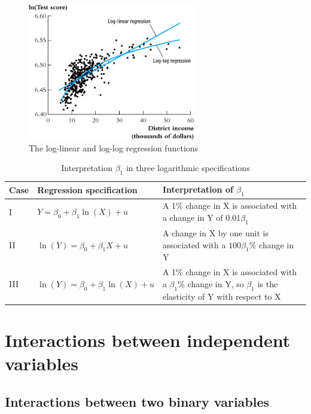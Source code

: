\documentclass[a4paper,11pt]{article}
\begin{document}
\begin{itemize}
\begin{figure}[htbp]
\centering
\includegraphics[width=0.65\textwidth]{img/fig-8-6.png}
\caption{\label{fig:org04cb59a}
The log-linear and log-log regression functions}
\end{figure}

\begin{table}[htbp]
\caption{Interpretation \(\beta_1\) in three logarithmic specifications}
\centering
\begin{tabular}{lp{4.5cm}p{8.5cm}}
Case & Regression specification & Interpretation of \(\beta_1\)\\
\hline
I & \(Y = \beta_0 + \beta_1 \ln(X) + u\) & A 1\% change in X is associated with a change in Y of \(0.01\beta_{1}\)\\
II & \(\ln(Y) = \beta_0 + \beta_1 X + u\) & A change in X by one unit is associated with a \(100\beta_1\%\) change in Y\\
III & \(\ln(Y) = \beta_0 + \beta_1 \ln(X) + u\) & A 1\% change in X is associated with a \(\beta_{1}\%\) change in Y, so \(\beta_1\) is the elasticity of Y with respect to X\\
\end{tabular}
\end{table}
\end{itemize}


\section{Interactions between independent variables}
\label{sec:orga725be1}

\subsection{Interactions between two binary variables}
\label{sec:org19d82d6}
\end{document}
